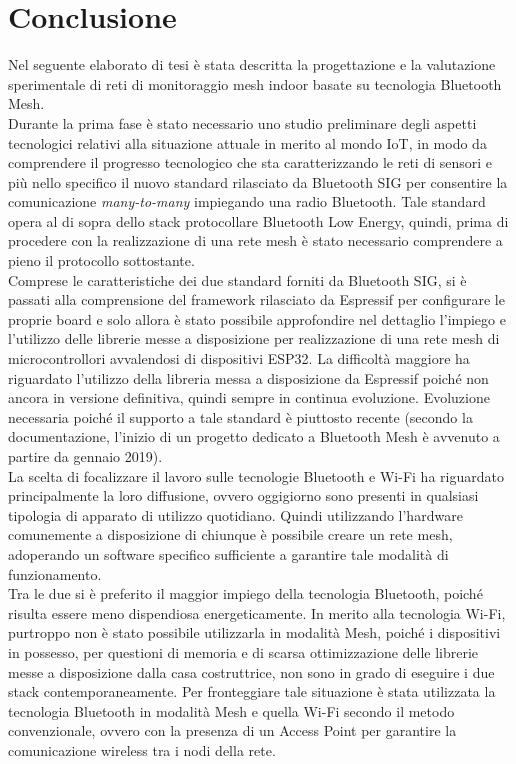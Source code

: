 \chapter{Conclusione}
\label{ch:conclusione}
Nel seguente elaborato di tesi è stata descritta la progettazione e la valutazione sperimentale di reti di monitoraggio mesh indoor basate su tecnologia Bluetooth Mesh.\\

\noindent Durante la prima fase è stato necessario uno studio preliminare degli aspetti tecnologici relativi alla situazione attuale in merito al mondo IoT, in modo da comprendere il progresso tecnologico che sta caratterizzando le reti di sensori e più nello specifico il nuovo standard rilasciato da Bluetooth SIG per consentire la comunicazione \textit{many-to-many} impiegando una radio Bluetooth. Tale standard opera al di sopra dello stack protocollare Bluetooth Low Energy, quindi, prima di procedere con la realizzazione di una rete mesh è stato necessario comprendere a pieno il protocollo sottostante.\\
Comprese le caratteristiche dei due standard forniti da Bluetooth SIG, si è passati alla comprensione del framework rilasciato da Espressif per configurare le proprie board e solo allora è stato possibile approfondire nel dettaglio l’impiego e l'utilizzo delle librerie messe a disposizione per realizzazione di una rete mesh di microcontrollori avvalendosi di dispositivi ESP32. La difficoltà maggiore ha riguardato l'utilizzo della libreria messa a disposizione da Espressif poiché non ancora in versione definitiva, quindi sempre in continua evoluzione. Evoluzione necessaria poiché il supporto a tale standard è piuttosto recente (secondo la documentazione, l'inizio di un progetto dedicato a Bluetooth Mesh è avvenuto a partire da gennaio 2019).\\
La scelta di focalizzare il lavoro sulle tecnologie Bluetooth e Wi-Fi ha riguardato principalmente la loro diffusione, ovvero oggigiorno sono presenti in qualsiasi tipologia di apparato di utilizzo quotidiano. Quindi utilizzando l'hardware comunemente a disposizione di chiunque è possibile creare un rete mesh, adoperando un software specifico sufficiente a garantire tale modalità di funzionamento.\\
Tra le due si è preferito il maggior impiego della tecnologia Bluetooth, poiché risulta essere meno dispendiosa energeticamente. In merito alla tecnologia Wi-Fi, purtroppo non è stato possibile utilizzarla in modalità Mesh, poiché i dispositivi in possesso, per questioni di memoria e di scarsa ottimizzazione delle librerie messe a disposizione dalla casa costruttrice, non sono in grado di eseguire i due stack contemporaneamente. Per fronteggiare tale situazione è stata utilizzata la tecnologia Bluetooth in modalità Mesh e quella Wi-Fi secondo il metodo convenzionale, ovvero con la presenza di un Access Point per garantire la comunicazione wireless tra i nodi della rete.\\
